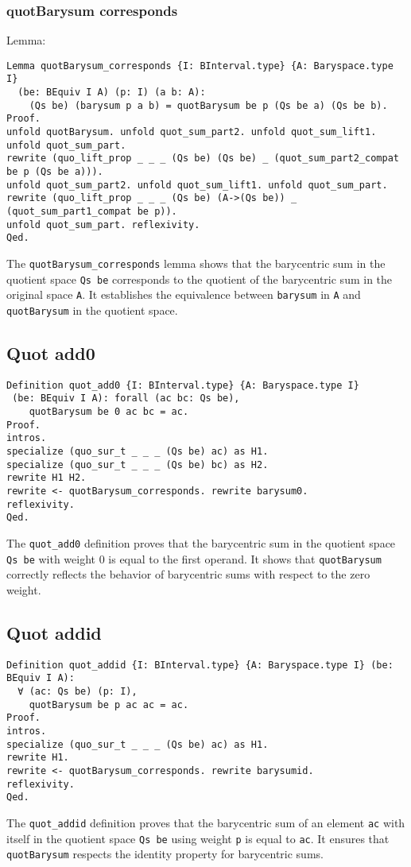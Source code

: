 \documentclass[a4paper,10pt]{article} %
\begin{document}
\subsubsection{quotBarysum corresponds}
Lemma:
\begin{lstlisting}
Lemma quotBarysum_corresponds {I: BInterval.type} {A: Baryspace.type I}
  (be: BEquiv I A) (p: I) (a b: A):
    (Qs be) (barysum p a b) = quotBarysum be p (Qs be a) (Qs be b).
Proof.
unfold quotBarysum. unfold quot_sum_part2. unfold quot_sum_lift1. unfold quot_sum_part. 
rewrite (quo_lift_prop _ _ _ (Qs be) (Qs be) _ (quot_sum_part2_compat be p (Qs be a))). 
unfold quot_sum_part2. unfold quot_sum_lift1. unfold quot_sum_part.
rewrite (quo_lift_prop _ _ _ (Qs be) (A->(Qs be)) _ (quot_sum_part1_compat be p)). 
unfold quot_sum_part. reflexivity.
Qed.
\end{lstlisting}

The \texttt{quotBarysum\_corresponds} lemma shows that the barycentric sum in the quotient space \texttt{Qs be} corresponds to the quotient of the barycentric sum in the original space \texttt{A}. It establishes the equivalence between \texttt{barysum} in \texttt{A} and \texttt{quotBarysum} in the quotient space.

\subsection{Quot add0}
\begin{lstlisting}
Definition quot_add0 {I: BInterval.type} {A: Baryspace.type I}
 (be: BEquiv I A): forall (ac bc: Qs be),
    quotBarysum be 0 ac bc = ac.
Proof. 
intros.
specialize (quo_sur_t _ _ _ (Qs be) ac) as H1.
specialize (quo_sur_t _ _ _ (Qs be) bc) as H2.
rewrite H1 H2.
rewrite <- quotBarysum_corresponds. rewrite barysum0.
reflexivity.
Qed.
\end{lstlisting}
The \texttt{quot\_add0} definition proves that the barycentric sum in the quotient space \texttt{Qs be} with weight 0 is equal to the first operand. It shows that \texttt{quotBarysum} correctly reflects the behavior of barycentric sums with respect to the zero weight.

\subsection{Quot addid}
\begin{lstlisting}
Definition quot_addid {I: BInterval.type} {A: Baryspace.type I} (be: BEquiv I A): 
  ∀ (ac: Qs be) (p: I),
    quotBarysum be p ac ac = ac.
Proof. 
intros.
specialize (quo_sur_t _ _ _ (Qs be) ac) as H1.
rewrite H1. 
rewrite <- quotBarysum_corresponds. rewrite barysumid.
reflexivity.
Qed.
\end{lstlisting}
The \texttt{quot\_addid} definition proves that the barycentric sum of an element \texttt{ac} with itself in the quotient space \texttt{Qs be} using weight \texttt{p} is equal to \texttt{ac}. It ensures that \texttt{quotBarysum} respects the identity property for barycentric sums.
\end{document}
